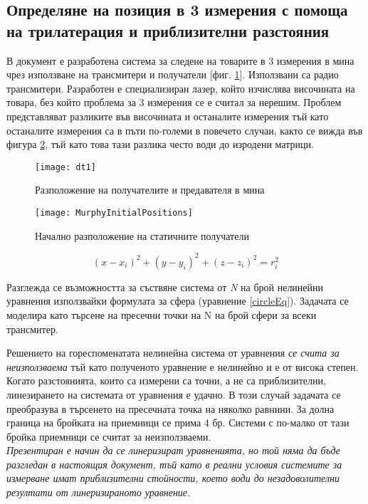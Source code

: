 \subsection{Определяне на позиция в 3 измерения с помоща на трилатерация и приблизителни разстояния}

В документ \cite{murphy} е разработена система за следене на товарите в 3 измерения в мина чрез използване на трансмитери и получатели [фиг. \ref{fig:mine}]. Използвани са радио трансмитери. Разработен е специализиран лазер, който изчислява височината на товара, без който проблема за 3 измерения се е считал за нерешим. Проблем представляват разликите във височината и останалите измерения тъй като останалите измерения са в пъти по-големи в повечето случаи, както се вижда във фигура \ref{fig:initPos}, тъй като това тази разлика често води до изродени матрици.

\begin{figure}
    \centering
    \centerline{\texttt{[image: dt1]}}
    \caption{Разположение на получателите и предавателя в мина}
    \label{fig:mine}
\end{figure}

\begin{figure}
    \centering
    \centerline{\texttt{[image: MurphyInitialPositions]}}
    \caption{Начално разположение на статичните получатели}
    \label{fig:initPos}
\end{figure}


\begin{equation}\label{circleEq}
    (x-x_i)^2 + (y-y_i)^2 +(z-z_i)^2=r_i^2
\end{equation}

Разглежда се възможността за съствяне система от \textit{N} на брой нелинейни уравнения използвайки формулата за сфера (уравнение \ref{circleEq}). Задачата се моделира като търсене на пресечни точки на N на брой сфери за всеки трансмитер.

Решението на гореспоменатата нелинейна система от уравнения \emph{се счита за неизползваема} тъй като полученото уравнение е нелинейно и е от висока степен. Когато разстоянията, които са измерени са точни, а не са приблизителни, линезирането на системата от уравнения е удачно. В този случай задачата се преобразува в търсенето на пресечната точка на няколко равнини.  За долна граница на бройката на приемници се прима 4 бр. Системи с по-малко от тази бройка приемници се считат за неизползваеми. \\

\emph{
    Презентиран е начин да се линеризират уравненията, но той няма да бъде разгледан в настоящия документ, тъй като в реални условия системите за измерване имат приблизителни стойности, което води до незадоволителни резултати от линеризираното уравнение.
}
\\

